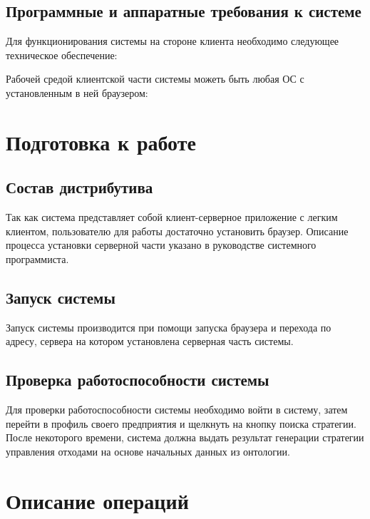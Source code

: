 \documentclass[a4paper]{G2-105}
\begin{document}
\section{Программные и аппаратные требования к системе}

Для функционирования системы на стороне клиента необходимо следующее техническое обеспечение:
\CommonClientRequirements

Рабочей средой клиентской части системы можеть быть любая ОС с установленным в ней браузером:
\CommonBrowserRequirements

\chapter{Подготовка к работе}

\ttl

\section{Состав дистрибутива}

Так как система представляет собой клиент-серверное приложение с легким клиентом, пользователю для работы достаточно установить браузер. Описание процесса установки серверной части указано в руководстве системного программиста.

\section{Запуск системы}

Запуск системы производится при помощи запуска браузера и перехода по адресу, сервера на котором установлена серверная часть системы.

\section{Проверка работоспособности системы}

Для проверки работоспособности системы необходимо войти в систему, затем перейти в профиль своего предприятия и щелкнуть на кнопку поиска стратегии. После некоторого времени, система должна выдать результат генерации стратегии управления отходами на основе начальных данных из онтологии.

\chapter{Описание операций}

\ttl
\end{document}
